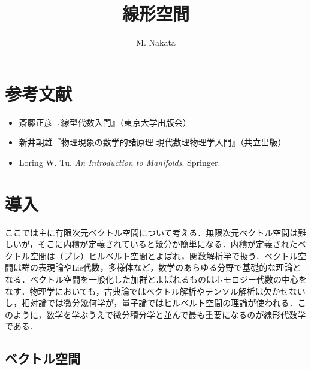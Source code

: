 \documentclass[pandoc,base=10pt,b5j,precisetext]{bxjsarticle}
\title{線形空間}
\author{M. Nakata}
\date{}
\providecommand{\tightlist}{%
  \setlength{\itemsep}{0pt}\setlength{\parskip}{0pt}}
\begin{document}
\maketitle

{
\setcounter{tocdepth}{3}
\tableofcontents
}
\newcommand{\deli}{\,:\,}
\newcommand{\bb}[1]{\boldsymbol{#1}}
\renewcommand{\i}{\mathrm{i}}
\renewcommand{\bar}[1]{\overline{#1}}
\renewcommand{\le}{\leqslant}
\renewcommand{\ge}{\geqslant}
\newcommand{\qset}[2]{{#1}/\!\,{#2}}
\newcommand{\scr}[1]{\mathscr{#1}}
\renewcommand{\cal}[1]{\mathcal{#1}}
\newcommand{\pfrac}[2]{\frac{\partial #1}{\partial #2}}
\newcommand{\card}{\mathop{\mathrm{card}}\nolimits}
\newcommand{\Span}{\mathop{\mathrm{span}}}
\newcommand{\obj}{\mathop{\mathrm{obj}}}
\newcommand{\Hom}{\mathop{\mathrm{Hom}}}

\hypertarget{ux53c2ux8003ux6587ux732e}{%
\section{参考文献}\label{ux53c2ux8003ux6587ux732e}}

\begin{itemize}
\tightlist
\item
  斎藤正彦『線型代数入門』（東京大学出版会）
\item
  新井朝雄『物理現象の数学的諸原理 現代数理物理学入門』（共立出版）
\item
  Loring W. Tu. \emph{An Introduction to Manifolds}. Springer.
\end{itemize}

\hypertarget{linear-algebra-introduction}{%
\section{導入}\label{linear-algebra-introduction}}

ここでは主に有限次元ベクトル空間について考える．無限次元ベクトル空間は難しいが，そこに内積が定義されていると幾分か簡単になる．内積が定義されたベクトル空間は（プレ）ヒルベルト空間とよばれ，関数解析学で扱う．ベクトル空間は群の表現論やLie代数，多様体など，数学のあらゆる分野で基礎的な理論となる．ベクトル空間を一般化した加群とよばれるものはホモロジー代数の中心をなす．物理学においても，古典論ではベクトル解析やテンソル解析は欠かせないし，相対論では微分幾何学が，量子論ではヒルベルト空間の理論が使われる．このように，数学を学ぶうえで微分積分学と並んで最も重要になるのが線形代数学である．

\hypertarget{vector-spaces}{%
\subsection{ベクトル空間}\label{vector-spaces}}
\end{document}
